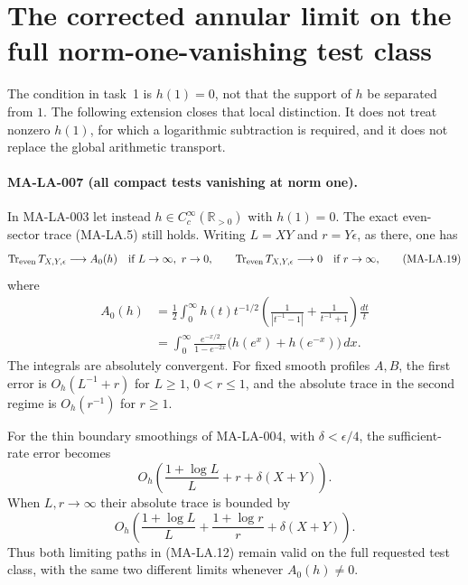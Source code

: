 \section{The corrected annular limit on the full norm-one-vanishing test class}
\label{sec:local-extension}

The condition in task~1 is $h(1)=0$, not that the support of
$h$ be separated from $1$. The following extension closes that
local distinction. It does not treat nonzero $h(1)$, for which
a logarithmic subtraction is required, and it does not replace
the global arithmetic transport.

\paragraph{MA-LA-007 (all compact tests vanishing at norm one).}
In MA-LA-003 let instead $h\in C_c^\infty(\mathbb R_{>0})$
with $h(1)=0$. The exact even-sector trace (MA-LA.5) still holds.
Writing $L=XY$ and $r=Y\epsilon$, as there, one has
\[
 \operatorname{Tr}_{\rm even}T_{X,Y,\epsilon}
 \longrightarrow A_0(h)
 \quad\hbox{if }L\to\infty,\ r\to0,
 \qquad
 \operatorname{Tr}_{\rm even}T_{X,Y,\epsilon}
 \longrightarrow0
 \quad\hbox{if }r\to\infty,
 \tag{MA-LA.19}
\]
where
\[
 \begin{split}
 A_0(h)
 &=\frac12\int_0^\infty h(t)t^{-1/2}
       \left(\frac1{|t^{-1}-1|}+\frac1{t^{-1}+1}\right)\frac{dt}{t}\\
 &=\int_0^\infty\frac{e^{-x/2}}{1-e^{-2x}}
                 \bigl(h(e^x)+h(e^{-x})\bigr)\,dx.
 \end{split}
 \tag{MA-LA.20}
\]
The integrals are absolutely convergent. For fixed smooth
profiles $A,B$, the first error is $O_h(L^{-1}+r)$ for
$L\ge1$, $0<r\le1$, and the absolute trace in the second
regime is $O_h(r^{-1})$ for $r\ge1$.

For the thin boundary smoothings of MA-LA-004, with
$\delta<\epsilon/4$, the sufficient-rate error becomes
\[
 O_h\!\left(\frac{1+\log L}{L}+r+\delta(X+Y)\right).
 \tag{MA-LA.21}
\]
When $L,r\to\infty$ their absolute trace is bounded by
\[
 O_h\!\left(\frac{1+\log L}{L}
             +\frac{1+\log r}{r}+\delta(X+Y)\right).
 \tag{MA-LA.22}
\]
Thus both limiting paths in (MA-LA.12) remain valid on the full
requested test class, with the same two different limits whenever
$A_0(h)\ne0$.

